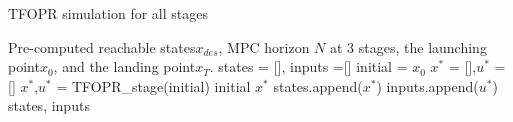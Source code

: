 \begin{algorithm}[t!]
    \caption{TFOPR simulation for all stages}
    \begin{algorithmic}[1]
    \label{alg:whip}
    \REQUIRE Pre-computed reachable states$x_{des}$, MPC horizon $N$ at 3 stages, the launching point$x_{0}$, and the landing point$x_{T}$.
    \STATE states = [], inputs =[]
    \STATE initial = $x_{0}$ 
    \STATE $x^*$ = [],$u^*$ = []
        \STATE $x^*$,$u^*$ = TFOPR_{stage}(initial)
        \STATE initial \gets $x^*$
    \STATE states.append($x^*$)
    \STATE inputs.append($u^*$)
    \ENDFOR
    \RETURN states, inputs
    \end{algorithmic}
\end{algorithm}